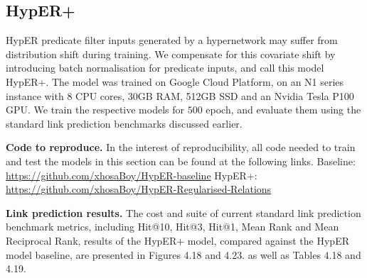 
\subsection{HypER+}
HypER predicate filter inputs generated by a hypernetwork may suffer from distribution shift during training. We compensate for this covariate shift by introducing batch normalisation for predicate inputs, and call this model HypER+. The model was trained on Google Cloud Platform, on an N1 series instance with  8 CPU cores, 30GB RAM, 512GB SSD and an Nvidia Tesla P100 GPU. We train the respective models for $ 500 $ epoch, and evaluate them using the standard link prediction benchmarks discussed earlier. \par

\noindent \textbf{Code to reproduce.} In the interest of reproducibility, all code needed to train and test the models in this section can be found at the following links. \newline
Baseline: \url{https://github.com/xhosaBoy/HypER-baseline} \newline
HypER+: \url{https://github.com/xhosaBoy/HypER-Regularised-Relations} \par

\noindent \textbf{Link prediction results.} The cost and suite of current standard link prediction benchmark metrics, including Hit@10, Hit@3, Hit@1, Mean Rank and Mean Reciprocal Rank, results of the HypER+ model, compared against the HypER model baseline, are presented in Figures 4.18 and 4.23. as well as Tables 4.18 and 4.19. \par



\bigskip


